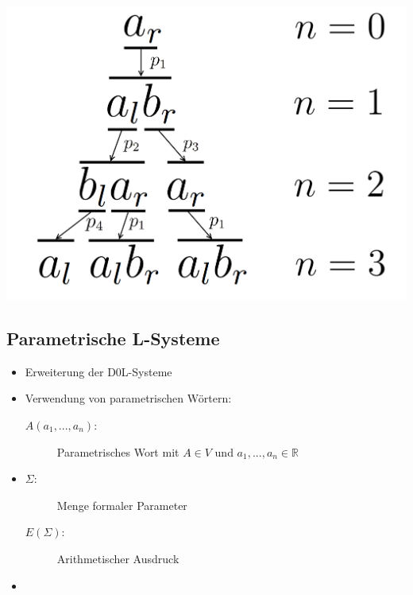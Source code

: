 \newpage

\begin{center}
	\includegraphics[height=1\textheight]{images/AnabaenaAbleitung.png}
\end{center}

\newpage
{}
\subsection{Parametrische L-Systeme\\ }

\begin{itemize}
	\item Erweiterung der D0L-Systeme \\
	
	\item Verwendung von parametrischen Wörtern:
	\begin{description}
			\item[\boldmath$A(a_1, ..., a_n):$] Parametrisches Wort mit $A\in V$ und $a_1, ..., a_n \in \mathbb{R}$
	\end{description}
	
	\item 
	\begin{description}
		\item[\boldmath$\Sigma:$] Menge formaler Parameter
		\item[\boldmath$E(\Sigma):$] Arithmetischer Ausdruck
	\end{description}

	\item 
\end{itemize}

